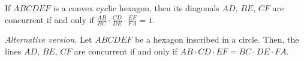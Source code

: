 If $ABCDEF$ is a convex cyclic hexagon, then its diagonals $AD$, $BE$, $CF$ are concurrent if and only if $\frac{AB}{BC}\cdot \frac{CD}{DE}\cdot \frac{EF}{FA}=1$.

\textit{Alternative version.} Let $ABCDEF$ be a hexagon inscribed in a circle. Then, the lines $AD$, $BE$, $CF$ are concurrent if and only if $AB\cdot CD\cdot EF=BC\cdot DE\cdot FA$.